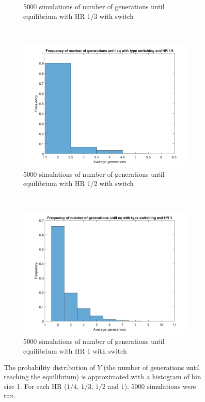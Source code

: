 \begin{figure}[H]
\begin{subfigure}{0.45\textwidth}
        \caption{5000 simulations of number of generations until equilibrium with HR 1/3 with switch}
        \label{hists hap 1/3}
    \end{subfigure}
	~
    \begin{subfigure}{0.45\textwidth}
        \includegraphics[width=\textwidth]{AantGen3.pdf}
        \caption{5000 simulations of number of generations until equilibrium with HR 1/2 with switch}
        \label{hists hap 1/2}
    \end{subfigure}
    ~
    \begin{subfigure}{0.45\textwidth}
        \includegraphics[width=\textwidth]{AantGen4.pdf}
        \caption{5000 simulations of number of generations until equilibrium with HR 1 with switch}
        \label{hists hap 1}
    \end{subfigure}
    \caption{The probability distribution of $Y$ (the number of generations until reaching the equilibrium) is approximated with a histogram of bin size 1. 
    For each HR ($1/4$, $1/3$, $1/2$ and $1$), $5000$ simulations were ran.}
    \label{fig:histogramSw}
\end{figure}

